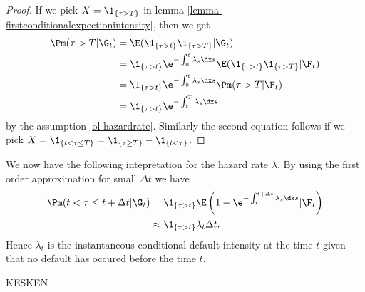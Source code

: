 \begin{proof}
If we pick $X = \1_{ \{ \tau > T \} }$ in lemma \ref{lemma-firstconditionalexpectionintensity}, then we get
  \begin{align}
    \Pm ( \tau > T | \G_t ) &= \E (\1_{ \{ \tau > t \} } \1_{ \{ \tau > T \} } | \G_t ) \\
      &= \1_{ \{ \tau > t \} } \e^{-\int_0^t \lambda_s \dx s} \E ( \1_{ \{ \tau > t \} } \1_{ \{ \tau > T \} } | \F_t ) \\
      &= \1_{ \{ \tau > t \} } \e^{-\int_0^t \lambda_s \dx s} \Pm ( \tau > T | \F_t ) \\
      &= \1_{ \{ \tau > t \} } \e^{-\int_t^T \lambda_s \dx s}
  \end{align}
by the assumption \ref{ol-hazardrate}. Similarly the second equation follows if we pick $X = \1_{ \{ t < \tau \leq T \} } = \1_{ \{ \tau \geq T \} } - \1_{ \{ t < \tau \} }$.
\end{proof}

We now have the following intepretation for the hazard rate $\lambda$. By using the first order approximation for small $\Delta t$ we have
  \begin{align}
    \Pm ( t < \tau \leq t + \Delta t | \G_t ) &= \1_{ \{ \tau > t \} } \E \left( 1 - \e^{-\int_t^{t+\Delta t} \lambda_s \dx s} | \F_t \right) \\
    &\approx \1_{ \{ \tau > t \} } \lambda_t \Delta t .
  \end{align}
Hence $\lambda_t$ is the instantaneous conditional default intensity at the time $t$ given that no default has occured before the time $t$.

KESKEN

